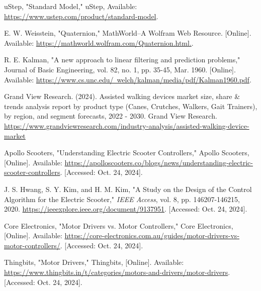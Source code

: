 \begin{thebibliography}{45}
	 uStep, "Standard Model," uStep, Available: \href{https://www.ustep.com/product/standard-model}{https://www.ustep.com/product/standard-model}.
	
	 E. W. Weisstein, "Quaternion," MathWorld--A Wolfram Web Resource. [Online]. Available: \href{https://mathworld.wolfram.com/Quaternion.html.}{https://mathworld.wolfram.com/Quaternion.html.}.
	
	 R. E. Kalman, "A new approach to linear filtering and prediction problems," Journal of Basic Engineering, vol. 82, no. 1, pp. 35-45, Mar. 1960. [Online]. Available: \href{https://www.cs.unc.edu/~welch/kalman/media/pdf/Kalman1960.pdf}{https://www.cs.unc.edu/~welch/kalman/media/pdf/Kalman1960.pdf}.

	
	 Grand View Research. (2024). Assisted walking devices market size, share \& trends analysis report by product type (Canes, Crutches, Walkers, Gait Trainers), by region, and segment forecasts, 2022 - 2030. Grand View Research. \href{https://www.grandviewresearch.com/industry-analysis/assisted-walking-device-market}{https://www.grandviewresearch.com/industry-analysis/assisted-walking-device-market}
	
	 Apollo Scooters, "Understanding Electric Scooter Controllers," Apollo Scooters, [Online]. Available: \href{https://apolloscooters.co/blogs/news/understanding-electric-scooter-controllers?srsltid=AfmBOoqWTbV4qa2VxA8NxpdquVzQMn4LeQYiwBG756xhscX0vExgNW-8}{https://apolloscooters.co/blogs/news/understanding-electric-scooter-controllers}. [Accessed: Oct. 24, 2024].
	
	 J. S. Hwang, S. Y. Kim, and H. M. Kim, "A Study on the Design of the Control Algorithm for the Electric Scooter," \textit{IEEE Access}, vol. 8, pp. 146207-146215, 2020. \href{https://ieeexplore.ieee.org/document/9137951}{https://ieeexplore.ieee.org/document/9137951}. [Accessed: Oct. 24, 2024].

	 Core Electronics, "Motor Drivers vs. Motor Controllers," Core Electronics, [Online]. Available: \href{https://core-electronics.com.au/guides/motor-drivers-vs-motor-controllers/}{https://core-electronics.com.au/guides/motor-drivers-vs-motor-controllers/}. [Accessed: Oct. 24, 2024].
	
	 Thingbits, "Motor Drivers," Thingbits, [Online]. Available: \href{https://www.thingbits.in/t/categories/motors-and-drivers/motor-drivers}{https://www.thingbits.in/t/categories/motors-and-drivers/motor-drivers}. [Accessed: Oct. 24, 2024].
	

\end{thebibliography}

